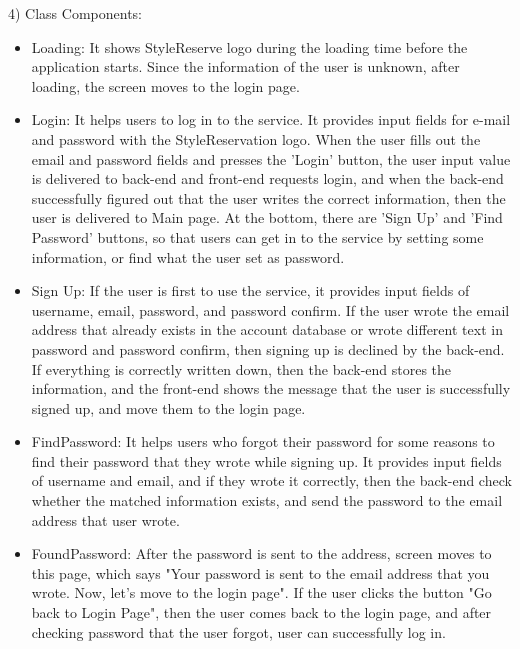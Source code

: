 \documentclass[conference]{IEEEtran}
\begin{document}
4) Class Components:
\begin{itemize}
    \item Loading: It shows StyleReserve logo during the loading time before the application starts. Since the information of the user is unknown, after loading, the screen moves to the login page.\\
    
    \item Login: It helps users to log in to the service. It provides input fields for e-mail and password with the StyleReservation logo. When the user fills out the email and password fields and presses the ’Login’ button, the user input value is delivered to back-end and front-end requests login, and when the back-end successfully figured out that the user writes the correct information, then the user is delivered to Main page. At the bottom, there are 'Sign Up' and 'Find Password' buttons, so that users can get in to the service by setting some information, or find what the user set as password.\\
    
    \item Sign Up: If the user is first to use the service, it provides input fields of username, email, password, and password confirm. If the user wrote the email address that already exists in the account database or wrote different text in password and password confirm, then signing up is declined by the back-end. If everything is correctly written down, then the back-end stores the information, and the front-end shows the message that the user is successfully signed up, and move them to the login page.\\
    
    \item FindPassword: It helps users who forgot their password for some reasons to find their password that they wrote while signing up. It provides input fields of username and email, and if they wrote it correctly, then the back-end check whether the matched information exists, and send the password to the email address that user wrote.\\
    
    \item FoundPassword: After the password is sent to the address, screen moves to this page, which says "Your password is sent to the email address that you wrote. Now, let's move to the login page". If the user clicks the button "Go back to Login Page", then the user comes back to the login page, and after checking password that the user forgot, user can successfully log in.\\
    

\end{itemize}
\end{document}
